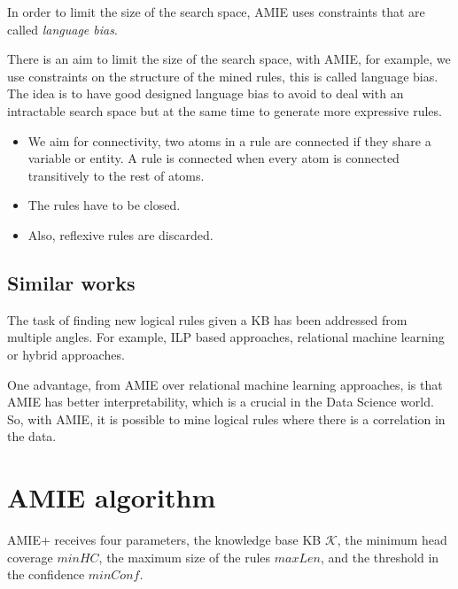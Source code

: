 \documentclass{article}
\begin{document}
In order to limit the size of the search space, AMIE uses constraints that are called
\textit{language bias}.


There is an aim to limit the size of the search space, with AMIE, for example,
we use constraints on the structure of the mined rules, this is called language
bias. The idea is to have good designed language bias to avoid to deal with an
intractable search space but at the same time to generate more expressive rules.

\begin{itemize}
    \item We aim for connectivity, two atoms in a rule are connected if they share a variable or
entity. A rule is connected when every atom is connected transitively to the
rest of atoms.
    \item The rules have to be closed.
    \item Also, reflexive rules are discarded.
\end{itemize}

\subsection{Similar works}

The task of finding new logical rules given a KB has been addressed from
multiple angles. For example, ILP based approaches, relational machine learning
or hybrid approaches.

One advantage, from AMIE over relational machine learning approaches, is that
AMIE has better interpretability, which is a crucial in the Data Science world.
So, with AMIE, it is possible to mine logical rules where there is a
correlation in the data.

\section{AMIE algorithm}


AMIE+ receives four parameters, the knowledge base KB $\mathcal{K}$, the
minimum head coverage $minHC$, the maximum size of the rules $maxLen$, and the
threshold in the confidence $minConf$. 
\end{document}
